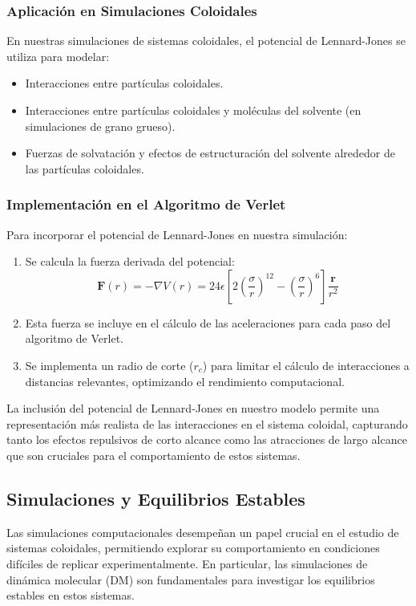 \documentclass[twocolumn]{article}
\begin{document}
\subsubsection*{Aplicación en Simulaciones Coloidales}
En nuestras simulaciones de sistemas coloidales, el potencial de Lennard-Jones se utiliza para modelar:

\begin{itemize}
    \item Interacciones entre partículas coloidales.
    \item Interacciones entre partículas coloidales y moléculas del solvente (en simulaciones de grano grueso).
    \item Fuerzas de solvatación y efectos de estructuración del solvente alrededor de las partículas coloidales.
\end{itemize}

\subsubsection*{Implementación en el Algoritmo de Verlet}
Para incorporar el potencial de Lennard-Jones en nuestra simulación:

\begin{enumerate}
    \item Se calcula la fuerza derivada del potencial:
    \begin{equation}
        \mathbf{F}(r) = -\nabla V(r) = 24\epsilon \left[ 2\left(\frac{\sigma}{r}\right)^{12} - \left(\frac{\sigma}{r}\right)^{6} \right] \frac{\mathbf{r}}{r^2}
    \end{equation}
    \item Esta fuerza se incluye en el cálculo de las aceleraciones para cada paso del algoritmo de Verlet.
    \item Se implementa un radio de corte ($r_c$) para limitar el cálculo de interacciones a distancias relevantes, optimizando el rendimiento computacional.
\end{enumerate}

La inclusión del potencial de Lennard-Jones en nuestro modelo permite una representación más realista de las interacciones en el sistema coloidal, capturando tanto los efectos repulsivos de corto alcance como las atracciones de largo alcance que son cruciales para el comportamiento de estos sistemas.

\subsection*{Simulaciones y Equilibrios Estables}
Las simulaciones computacionales desempeñan un papel crucial en el estudio de sistemas coloidales, permitiendo explorar su comportamiento en condiciones difíciles de replicar experimentalmente. En particular, las simulaciones de dinámica molecular (DM) son fundamentales para investigar los equilibrios estables en estos sistemas.
\end{document}
